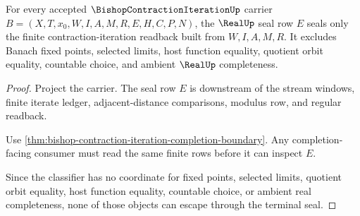 \begin{theorem}\label{thm:bishop-contraction-iteration-real-seal-nonescape}
For every accepted $\BishopContractionIterationUp$ carrier $B=(X,T,x_0,W,I,A,M,R,E,H,C,P,N)$, the $\RealUp$ seal row $E$ seals only the finite contraction-iteration readback built from $W,I,A,M,R$. It excludes Banach fixed points, selected limits, host function equality, quotient orbit equality, countable choice, and ambient $\RealUp$ completeness.
\end{theorem}
\begin{proof}
Project the carrier. The seal row $E$ is downstream of the stream windows, finite iterate ledger, adjacent-distance comparisons, modulus row, and regular readback.

Use \autoref{thm:bishop-contraction-iteration-completion-boundary}. Any completion-facing consumer must read the same finite rows before it can inspect $E$.

Since the classifier has no coordinate for fixed points, selected limits, quotient orbit equality, host function equality, countable choice, or ambient real completeness, none of those objects can escape through the terminal seal.
\end{proof}





